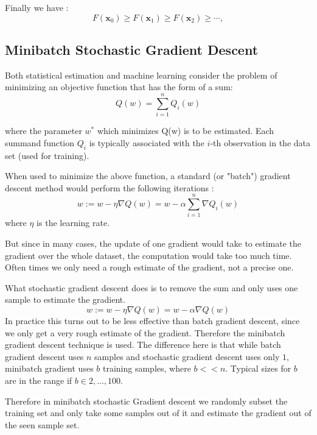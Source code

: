 \documentclass{acm_proc_article-sp}
\begin{document}
Finally we have \cite{Cauchy1847}:
\begin{equation}
F(\mathbf{x}_0)\ge F(\mathbf{x}_1)\ge F(\mathbf{x}_2)\ge \cdots,
\end{equation}


\subsection{Minibatch Stochastic Gradient Descent}

Both statistical estimation and machine learning consider the problem of minimizing an objective function that has the form of a sum:
\begin{equation}
Q(w) = \sum_{i=1}^n Q_i(w)
\end{equation}

where the parameter $w^*$ which minimizes Q(w) is to be estimated. Each summand function $Q_i$ is typically associated with the $i$-th observation in the data set (used for training).

When used to minimize the above function, a standard (or "batch") gradient descent method would perform the following iterations :
\begin{equation}
w := w - \eta \nabla Q(w) = w - \alpha \sum_{i=1}^n \nabla Q_i(w)
\end{equation}
where $\eta$ is the learning rate.

But since in many cases, the update of one gradient would take to estimate the gradient over the whole dataset, the computation would take too much time. Often times we only need a rough estimate of the gradient, not a precise one.

What stochastic gradient descent does is to remove the sum and only uses one sample to estimate the gradient. 
\begin{equation}
w := w - \eta \nabla Q(w) = w - \alpha \nabla Q(w)
\end{equation}
In practice this turns out to be less effective than batch gradient descent, since we only get a very rough estimate of the gradient.
Therefore the minibatch gradient descent technique is used. The difference here is that while batch gradient descent uses $n$ samples and stochastic gradient descent uses only $1$, minibatch gradient uses $b$ training samples, where $b << n$. Typical sizes for $b$ are in the range if $b \in {2,\ldots,100}$.

Therefore in minibatch stochastic Gradient descent we randomly subset the training set and only take some samples out of it and estimate the gradient out of the seen sample set.
\end{document}
